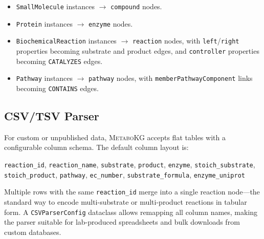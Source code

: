 \documentclass[10pt]{article}
\begin{document}
\begin{itemize}[leftmargin=*,itemsep=2pt]
  \item \texttt{SmallMolecule} instances $\to$ \texttt{compound} nodes.
  \item \texttt{Protein} instances $\to$ \texttt{enzyme} nodes.
  \item \texttt{BiochemicalReaction} instances $\to$ \texttt{reaction} nodes,
    with \texttt{left}/\texttt{right} properties becoming substrate and
    product edges, and \texttt{controller} properties becoming
    \texttt{CATALYZES} edges.
  \item \texttt{Pathway} instances $\to$ \texttt{pathway} nodes, with
    \texttt{memberPathwayComponent} links becoming \texttt{CONTAINS} edges.
\end{itemize}

\subsection{CSV/TSV Parser}

For custom or unpublished data, \textsc{MetaboKG} accepts flat tables with a
configurable column schema. The default column layout is:

\begin{center}
\small
\texttt{reaction\_id}, \texttt{reaction\_name}, \texttt{substrate},
\texttt{product}, \texttt{enzyme}, \texttt{stoich\_substrate},
\texttt{stoich\_product}, \texttt{pathway}, \texttt{ec\_number},
\texttt{substrate\_formula}, \texttt{enzyme\_uniprot}
\end{center}

Multiple rows with the same \texttt{reaction\_id} merge into a single
reaction node---the standard way to encode multi-substrate or multi-product
reactions in tabular form. A \texttt{CSVParserConfig} dataclass allows
remapping all column names, making the parser suitable for lab-produced
spreadsheets and bulk downloads from custom databases.



\end{document}
